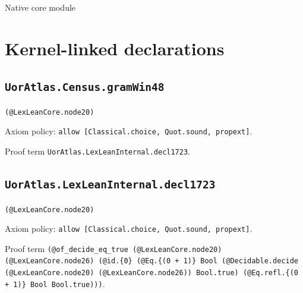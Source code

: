 \documentclass[11pt]{article}
\begin{document}
\begin{center}{\LARGE Native core module}\end{center}
\section*{Kernel-linked declarations}
\subsection*{\texttt{UorAtlas.Census.gramWin48}}
\noindent\texttt{(@LexLeanCore.node20)}\par
\noindent Axiom policy: \texttt{allow [Classical.choice, Quot.sound, propext]}.\par
\noindent Proof term \texttt{UorAtlas.LexLeanInternal.decl1723}.\par
\subsection*{\texttt{UorAtlas.LexLeanInternal.decl1723}}
\noindent\texttt{(@LexLeanCore.node20)}\par
\noindent Axiom policy: \texttt{allow [Classical.choice, Quot.sound, propext]}.\par
\noindent Proof term \texttt{(@of\_decide\_eq\_true (@LexLeanCore.node20) (@LexLeanCore.node26) (@id.\{0\} (@Eq.\{(0 + 1)\} Bool (@Decidable.decide (@LexLeanCore.node20) (@LexLeanCore.node26)) Bool.true) (@Eq.refl.\{(0 + 1)\} Bool Bool.true)))}.\par
\end{document}
